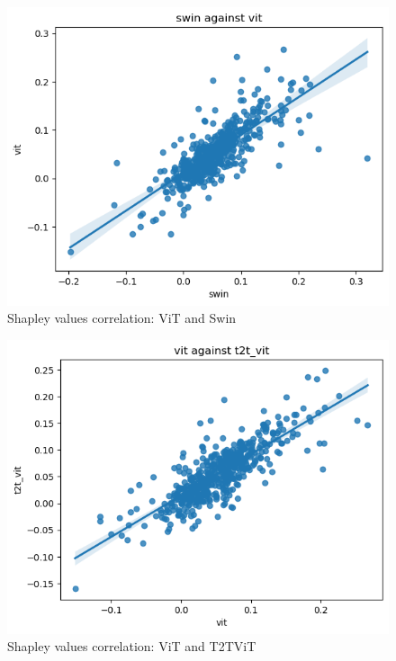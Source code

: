 \documentclass[magisterska,en]{pracamgr}
\begin{document}
\begin{figure}[H]
\centering
\includegraphics[scale=0.5]{./images/shap_vit_swin.png}
\caption{Shapley values correlation: ViT and Swin}
\label{shap_vit_swin}
\end{figure}


\begin{figure}[H]
\centering
\includegraphics[scale=0.5]{./images/shap_vit_t2t_vit.png}
\caption{Shapley values correlation: ViT and T2T\textunderscore ViT}
\label{shap_vit_t2t_vit}
\end{figure}
\end{document}
